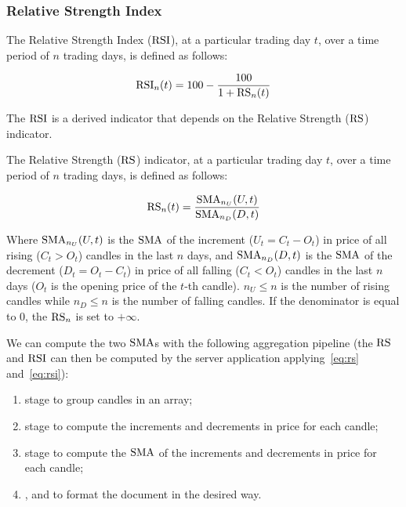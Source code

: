 \subsubsection{Relative Strength Index}

The Relative Strength Index (\(\operatorname{RSI}\)), at a particular trading day \(t\), over
a time period of \(n\) trading days, is defined as follows:

\begin{equation}\label{eq:rsi}
	\operatorname{RSI}_n(t) = 100 - \frac{100}{1 + \operatorname{RS}_n(t)}
\end{equation}

The \(\operatorname{RSI}\) is a derived indicator that depends on the Relative Strength
(\(\operatorname{RS}\)) indicator.

The Relative Strength (\(\operatorname{RS}\)) indicator, at a particular trading day \(t\),
over a time period of \(n\) trading days, is defined as follows:

\begin{equation}\label{eq:rs}
	\operatorname{RS}_n(t) = \frac{\operatorname{SMA}_{n_U}(U,t)}{\operatorname{SMA}_{n_D}(D,t)}
\end{equation}

Where \(\operatorname{SMA}_{n_U}(U,t)\) is the \(\operatorname{SMA}\) of the increment (\(U_t = C_t - O_t\))
in price of all rising (\(C_t > O_t\)) candles in the last \(n\) days, and
\(\operatorname{SMA}_{n_D}(D,t)\) is the \(\operatorname{SMA}\) of the decrement (\(D_t = O_t - C_t\)) in
price of all falling (\(C_t < O_t\)) candles in the last \(n\) days (\(O_t\) is
the opening price of the \(t\)-th candle). \(n_U \leq n\) is the number of
rising candles while \(n_D \leq n\) is the number of falling candles. If the
denominator is equal to \(0\), the \(\operatorname{RS}_n\) is set to \(+\infty\).

We can compute the two \(\operatorname{SMA}\)s with the following aggregation pipeline (the
\(\operatorname{RS}\) and \(\operatorname{RSI}\) can then be computed by the server application
applying~\eqref{eq:rs} and~\eqref{eq:rsi}):

\begin{enumerate}
	\item {} stage to group candles in an array;
	\item {} stage to compute the increments and decrements
		in price for each candle;
	\item {} stage to compute the \(\operatorname{SMA}\) of the increments
		and decrements in price for each candle;
	\item {},  and  to
		format the document in the desired way.
\end{enumerate}

